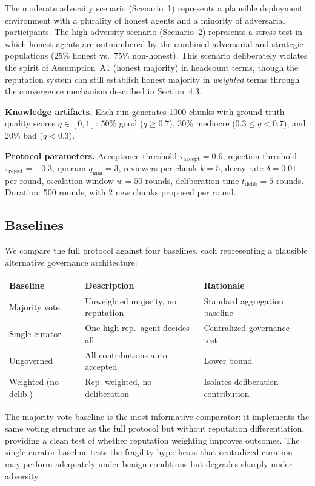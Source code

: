 \documentclass[11pt]{article}
\begin{document}
The moderate adversity scenario (Scenario~1) represents a plausible deployment environment with a plurality of honest agents and a minority of adversarial participants. The high adversity scenario (Scenario~2) represents a stress test in which honest agents are outnumbered by the combined adversarial and strategic populations (25\% honest vs.\ 75\% non-honest). This scenario deliberately violates the spirit of Assumption~A1 (honest majority) in headcount terms, though the reputation system can still establish honest majority in \textit{weighted} terms through the convergence mechanism described in Section~4.3.

\textbf{Knowledge artifacts.} Each run generates 1000 chunks with ground truth quality scores $q \in [0, 1]$: 50\% good ($q \geq 0.7$), 30\% mediocre ($0.3 \leq q < 0.7$), and 20\% bad ($q < 0.3$).

\textbf{Protocol parameters.} Acceptance threshold $\tau_{\text{accept}} = 0.6$, rejection threshold $\tau_{\text{reject}} = -0.3$, quorum $q_{\min} = 3$, reviewers per chunk $k = 5$, decay rate $\delta = 0.01$ per round, escalation window $w = 50$ rounds, deliberation time $t_{\text{delib}} = 5$ rounds. Duration: 500 rounds, with 2 new chunks proposed per round.

\subsection{Baselines}

We compare the full protocol against four baselines, each representing a plausible alternative governance architecture:

\begin{table}[h]
\centering
\small
\begin{tabular}{lll}
\toprule
\textbf{Baseline} & \textbf{Description} & \textbf{Rationale} \\
\midrule
Majority vote & Unweighted majority, no reputation & Standard aggregation baseline \\
Single curator & One high-rep.\ agent decides all & Centralized governance test \\
Ungoverned & All contributions auto-accepted & Lower bound \\
Weighted (no delib.) & Rep.-weighted, no deliberation & Isolates deliberation contribution \\
\bottomrule
\end{tabular}
\end{table}

The majority vote baseline is the most informative comparator: it implements the same voting structure as the full protocol but without reputation differentiation, providing a clean test of whether reputation weighting improves outcomes. The single curator baseline tests the fragility hypothesis: that centralized curation may perform adequately under benign conditions but degrades sharply under adversity.
\end{document}
